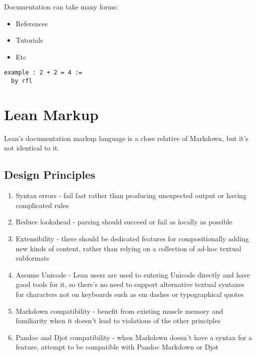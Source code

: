 \documentclass{memoir}
\begin{document}
Documentation can take many forms:

\begin{itemize}
\item References\item Tutorials\item Etc
\end{itemize}


\begin{verbatim}
example : 2 + 2 = 4 :=
  by rfl

\end{verbatim}





\section{Lean Markup}

Lean's documentation markup language is a close relative of Markdown, but it's not identical to it.



\subsection{Design Principles}

\begin{enumerate}
\item Syntax errors - fail fast rather than producing unexpected output or having complicated rules\item Reduce lookahead - parsing should succeed or fail as locally as possible\item Extensibility - there should be dedicated features for compositionally adding new kinds of content, rather than relying on a collection of ad-hoc textual subformats\item Assume Unicode - Lean users are used to entering Unicode directly and have good tools for it, so there's no need to support alternative textual syntaxes for characters not on keyboards such as em dashes or typographical quotes\item Markdown compatibility - benefit from existing muscle memory and familiarity when it doesn't lead to violations of the other principles\item Pandoc and Djot compatibility - when Markdown doesn't have a syntax for a feature, attempt to be compatible with Pandoc Markdown or Djot
\end{enumerate}
\end{document}
